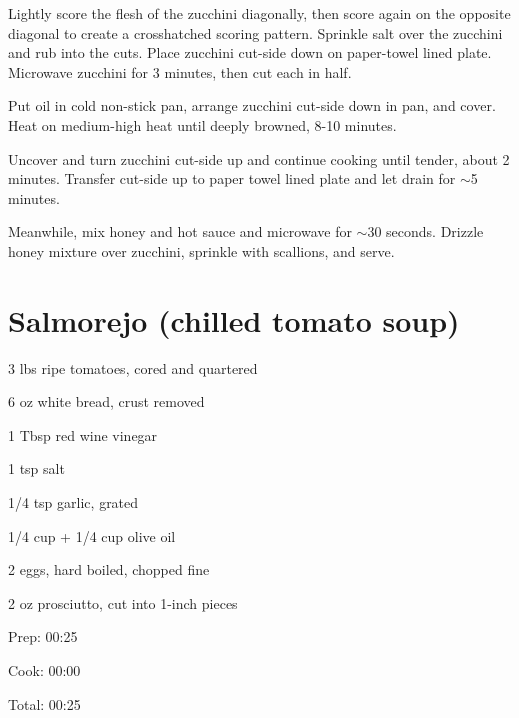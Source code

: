\documentclass[oneside]{book}  %
\def\thisrecipe{}  %
\newcommand{\recipe}[1]{\section{#1}\def\thisrecipe{: #1}} %
\newcommand{\about}{$\sim$}
\begin{document}
\begin{directions}
  \item Lightly score the flesh of the zucchini diagonally, then score again on
  the opposite diagonal to create a crosshatched scoring pattern. Sprinkle salt
  over the zucchini and rub into the cuts. Place zucchini cut-side down on
  paper-towel lined plate. Microwave zucchini for 3 minutes, then cut each in
  half.

  \item Put oil in cold non-stick pan, arrange zucchini cut-side down in pan,
  and cover. Heat on medium-high heat until deeply browned, 8-10 minutes.

  \item Uncover and turn zucchini cut-side up and continue cooking until tender,
  about 2 minutes. Transfer cut-side up to paper towel lined plate and let drain
  for \about 5 minutes.

  \item Meanwhile, mix honey and hot sauce and microwave for \about 30 seconds.
  Drizzle honey mixture over zucchini, sprinkle with scallions, and serve.
\end{directions}
\recipe{Salmorejo (chilled tomato soup)} \label{recipe:salmorejo} %
 

\begin{IT}
  \begin{ingredients}
    \item[3 lbs] ripe tomatoes, cored and quartered
    \item[6 oz] white bread, crust removed
    \item[1 Tbsp] red wine vinegar
    \item[1 tsp] salt
    \item[1/4 tsp] garlic, grated
    \item[1/4 cup + 1/4 cup] olive oil
    \item[2] eggs, hard boiled, chopped fine
    \item[2 oz] prosciutto, cut into 1-inch pieces
  \end{ingredients}

  \switchcolumn

  \begin{timeline}
    \item[Prep:]  00:25
    \item[Cook:]  00:00
    \item[Total:] 00:25
  \end{timeline}
\end{IT}
\end{document}
